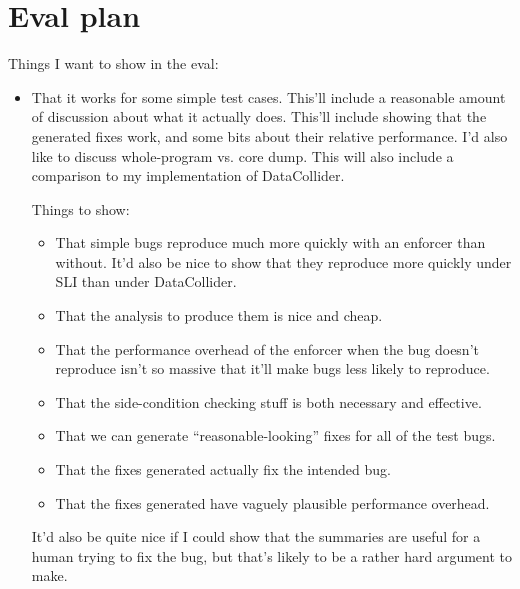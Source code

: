 
\section{Eval plan}

Things I want to show in the eval:

\begin{itemize}
\item That it works for some simple test cases.  This'll include a
  reasonable amount of discussion about what it actually does.
  This'll include showing that the generated fixes work, and some bits
  about their relative performance.  I'd also like to discuss
  whole-program vs. core dump.  This will also include a comparison to
  my implementation of DataCollider.

  Things to show:

  \begin{itemize}
  \item That simple bugs reproduce much more quickly with an enforcer
    than without.  It'd also be
    nice to show that they reproduce more quickly under SLI than under
    DataCollider.
  \item That the analysis to produce them is nice and cheap.
  \item That the performance overhead of the enforcer when the bug
    doesn't reproduce isn't so massive that it'll make bugs less
    likely to reproduce.
  \item That the side-condition checking stuff is both necessary and
    effective.
  \item That we can generate ``reasonable-looking'' fixes for all of
    the test bugs.
  \item That the fixes generated actually fix the intended bug.

  \item That the fixes generated have vaguely plausible performance
    overhead.
  \end{itemize}

  It'd also be quite nice if I could show that the summaries are
  useful for a human trying to fix the bug, but that's likely to be a
  rather hard argument to make.


\end{itemize}
